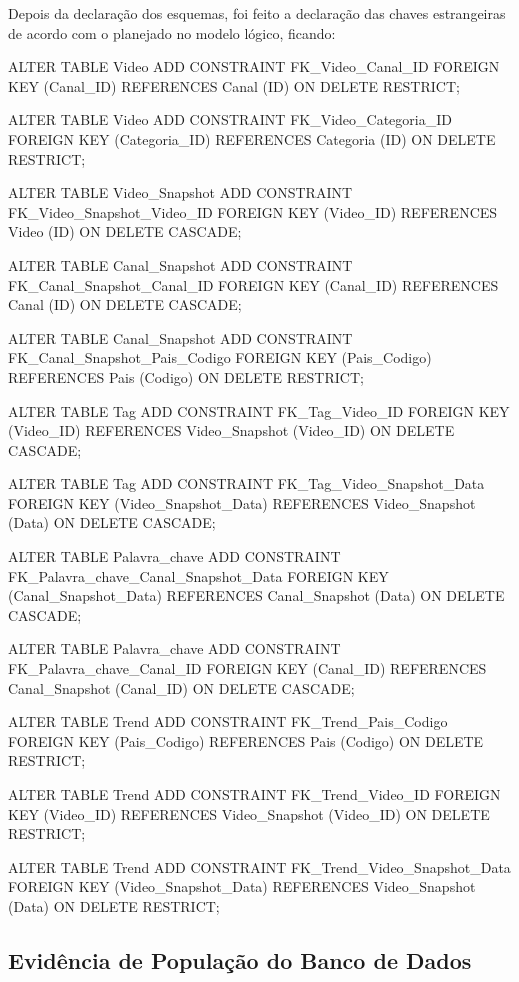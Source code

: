   Depois da declaração dos esquemas, foi feito a declaração das chaves estrangeiras de acordo com o planejado no modelo lógico, ficando:

  \begin{code}
ALTER TABLE Video ADD CONSTRAINT FK_Video_Canal_ID
  FOREIGN KEY (Canal_ID)
  REFERENCES Canal (ID)
  ON DELETE RESTRICT;

ALTER TABLE Video ADD CONSTRAINT FK_Video_Categoria_ID
  FOREIGN KEY (Categoria_ID)
  REFERENCES Categoria (ID)
  ON DELETE RESTRICT;

ALTER TABLE Video_Snapshot ADD CONSTRAINT FK_Video_Snapshot_Video_ID
  FOREIGN KEY (Video_ID)
  REFERENCES Video (ID)
  ON DELETE CASCADE;

ALTER TABLE Canal_Snapshot ADD CONSTRAINT FK_Canal_Snapshot_Canal_ID
  FOREIGN KEY (Canal_ID)
  REFERENCES Canal (ID)
  ON DELETE CASCADE;

ALTER TABLE Canal_Snapshot ADD CONSTRAINT
  FK_Canal_Snapshot_Pais_Codigo
  FOREIGN KEY (Pais_Codigo)
  REFERENCES Pais (Codigo)
  ON DELETE RESTRICT;

ALTER TABLE Tag ADD CONSTRAINT FK_Tag_Video_ID
  FOREIGN KEY (Video_ID)
  REFERENCES Video_Snapshot (Video_ID)
  ON DELETE CASCADE;

ALTER TABLE Tag ADD CONSTRAINT FK_Tag_Video_Snapshot_Data
  FOREIGN KEY (Video_Snapshot_Data)
  REFERENCES Video_Snapshot (Data)
  ON DELETE CASCADE;

ALTER TABLE Palavra_chave ADD CONSTRAINT
  FK_Palavra_chave_Canal_Snapshot_Data
  FOREIGN KEY (Canal_Snapshot_Data)
  REFERENCES Canal_Snapshot (Data)
  ON DELETE CASCADE;

ALTER TABLE Palavra_chave ADD CONSTRAINT FK_Palavra_chave_Canal_ID
  FOREIGN KEY (Canal_ID)
  REFERENCES Canal_Snapshot (Canal_ID)
  ON DELETE CASCADE;

ALTER TABLE Trend ADD CONSTRAINT FK_Trend_Pais_Codigo
  FOREIGN KEY (Pais_Codigo)
  REFERENCES Pais (Codigo)
  ON DELETE RESTRICT;

ALTER TABLE Trend ADD CONSTRAINT FK_Trend_Video_ID
  FOREIGN KEY (Video_ID)
  REFERENCES Video_Snapshot (Video_ID)
  ON DELETE RESTRICT;

ALTER TABLE Trend ADD CONSTRAINT FK_Trend_Video_Snapshot_Data
  FOREIGN KEY (Video_Snapshot_Data)
  REFERENCES Video_Snapshot (Data)
  ON DELETE RESTRICT;
  \end{code}

\subsection{Evidência de População do Banco de Dados}

